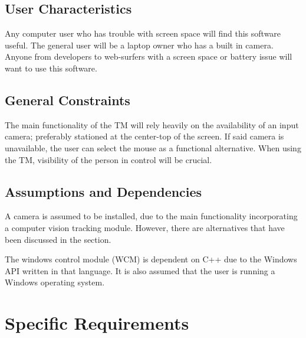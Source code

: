 \documentclass[titlepage]{article}
\begin{document}

\subsection{User Characteristics}
Any computer user who has trouble with screen space will find this software useful. The general user will be a laptop owner who has a built in camera. Anyone from developers to web-surfers with a screen space or battery issue will want to use this software.

\subsection{General Constraints}
\label{General Constraints}
The main functionality of the TM will rely heavily on the availability of an input camera; preferably stationed at the center-top of the screen. If said camera is unavailable, the user can select the mouse as a functional alternative. When using the TM, visibility of the person in control will be crucial.

\subsection{Assumptions and Dependencies}
A camera is assumed to be installed, due to the main functionality incorporating a computer vision tracking module. However, there are alternatives that have been discussed in the  section.

The windows control module (WCM) is dependent on C++ due to the Windows API written in that language. It is also assumed that the user is running a Windows operating system.

\section{Specific Requirements}
\label{Specific Requirements}

\end{document}
